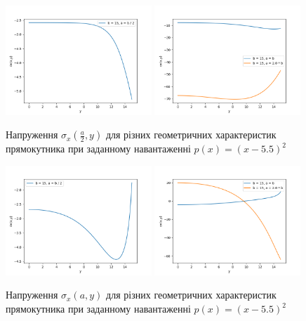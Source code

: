 \begin{figure}[H]
    \begin{center}
        \includegraphics[width=0.49\textwidth, scale=1]{images/results/static_1/sigma_x(a:2,y)1.png}
        \includegraphics[width=0.49\textwidth, scale=1]{images/results/static_1/sigma_x(a:2,y)2.png}
        \caption{Напруження $\sigma_x(\frac{a}{2}, y)$ для різних геометричних характеристик прямокутника при заданному навантаженні $p(x) = (x - 5.5)^2$}\label{static_1_sigma_x(a:2,y)}
    \end{center}
\end{figure}

\begin{figure}[H]
    \begin{center}
        \includegraphics[width=0.49\textwidth, scale=1]{images/results/static_1/sigma_x(a,y)1.png}
        \includegraphics[width=0.49\textwidth, scale=1]{images/results/static_1/sigma_x(a,y)2.png}
        \caption{Напруження $\sigma_x(a, y)$ для різних геометричних характеристик прямокутника при заданному навантаженні $p(x) = (x - 5.5)^2$}\label{static_1_sigma_x(a,y)}
    \end{center}
\end{figure}


